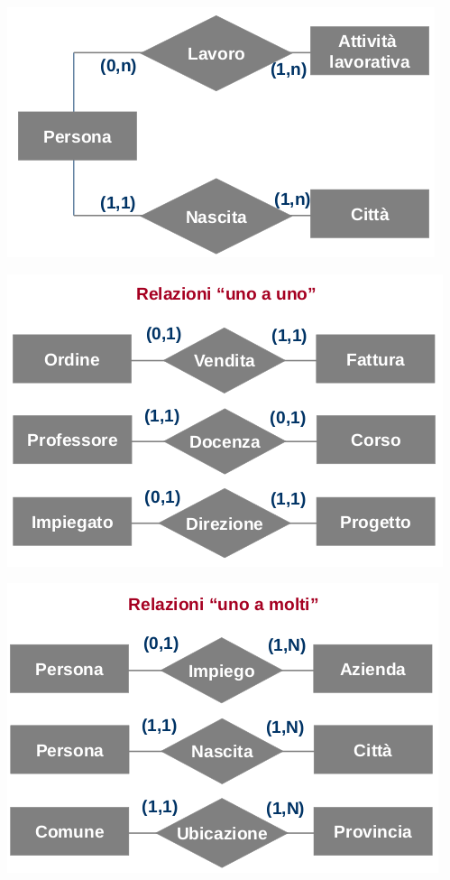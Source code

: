 \documentclass[a4paper,12pt, oneside]{book}
\begin{document}
\begin{center}
	\includegraphics[scale=0.8]{img/er4.png}
\end{center}
\begin{center}
	\includegraphics[scale=0.6]{img/er7.png}
\end{center}
\begin{center}
	\includegraphics[scale=0.6]{img/er6.png}
\end{center}
\end{document}
